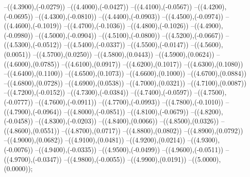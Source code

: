 {	--({\sx*(4.3900)},{\sy*(-0.0279)})
	--({\sx*(4.4000)},{\sy*(-0.0427)})
	--({\sx*(4.4100)},{\sy*(-0.0567)})
	--({\sx*(4.4200)},{\sy*(-0.0695)})
	--({\sx*(4.4300)},{\sy*(-0.0810)})
	--({\sx*(4.4400)},{\sy*(-0.0903)})
	--({\sx*(4.4500)},{\sy*(-0.0974)})
	--({\sx*(4.4600)},{\sy*(-0.1019)})
	--({\sx*(4.4700)},{\sy*(-0.1036)})
	--({\sx*(4.4800)},{\sy*(-0.1026)})
	--({\sx*(4.4900)},{\sy*(-0.0980)})
	--({\sx*(4.5000)},{\sy*(-0.0904)})
	--({\sx*(4.5100)},{\sy*(-0.0800)})
	--({\sx*(4.5200)},{\sy*(-0.0667)})
	--({\sx*(4.5300)},{\sy*(-0.0512)})
	--({\sx*(4.5400)},{\sy*(-0.0337)})
	--({\sx*(4.5500)},{\sy*(-0.0147)})
	--({\sx*(4.5600)},{\sy*(0.0051)})
	--({\sx*(4.5700)},{\sy*(0.0250)})
	--({\sx*(4.5800)},{\sy*(0.0443)})
	--({\sx*(4.5900)},{\sy*(0.0624)})
	--({\sx*(4.6000)},{\sy*(0.0785)})
	--({\sx*(4.6100)},{\sy*(0.0917)})
	--({\sx*(4.6200)},{\sy*(0.1017)})
	--({\sx*(4.6300)},{\sy*(0.1080)})
	--({\sx*(4.6400)},{\sy*(0.1100)})
	--({\sx*(4.6500)},{\sy*(0.1073)})
	--({\sx*(4.6600)},{\sy*(0.1000)})
	--({\sx*(4.6700)},{\sy*(0.0884)})
	--({\sx*(4.6800)},{\sy*(0.0728)})
	--({\sx*(4.6900)},{\sy*(0.0538)})
	--({\sx*(4.7000)},{\sy*(0.0321)})
	--({\sx*(4.7100)},{\sy*(0.0087)})
	--({\sx*(4.7200)},{\sy*(-0.0152)})
	--({\sx*(4.7300)},{\sy*(-0.0384)})
	--({\sx*(4.7400)},{\sy*(-0.0597)})
	--({\sx*(4.7500)},{\sy*(-0.0777)})
	--({\sx*(4.7600)},{\sy*(-0.0911)})
	--({\sx*(4.7700)},{\sy*(-0.0993)})
	--({\sx*(4.7800)},{\sy*(-0.1010)})
	--({\sx*(4.7900)},{\sy*(-0.0964)})
	--({\sx*(4.8000)},{\sy*(-0.0851)})
	--({\sx*(4.8100)},{\sy*(-0.0679)})
	--({\sx*(4.8200)},{\sy*(-0.0458)})
	--({\sx*(4.8300)},{\sy*(-0.0203)})
	--({\sx*(4.8400)},{\sy*(0.0066)})
	--({\sx*(4.8500)},{\sy*(0.0326)})
	--({\sx*(4.8600)},{\sy*(0.0551)})
	--({\sx*(4.8700)},{\sy*(0.0717)})
	--({\sx*(4.8800)},{\sy*(0.0802)})
	--({\sx*(4.8900)},{\sy*(0.0792)})
	--({\sx*(4.9000)},{\sy*(0.0682)})
	--({\sx*(4.9100)},{\sy*(0.0481)})
	--({\sx*(4.9200)},{\sy*(0.0214)})
	--({\sx*(4.9300)},{\sy*(-0.0076)})
	--({\sx*(4.9400)},{\sy*(-0.0335)})
	--({\sx*(4.9500)},{\sy*(-0.0499)})
	--({\sx*(4.9600)},{\sy*(-0.0511)})
	--({\sx*(4.9700)},{\sy*(-0.0347)})
	--({\sx*(4.9800)},{\sy*(-0.0055)})
	--({\sx*(4.9900)},{\sy*(0.0191)})
	--({\sx*(5.0000)},{\sy*(0.0000)});
}
